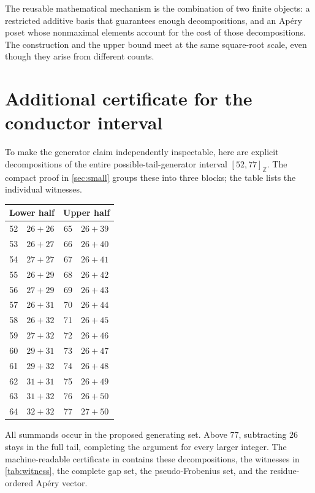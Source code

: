 \documentclass[11pt,letterpaper]{article}
\numberwithin{equation}{section}
\theoremstyle{definition}
\theoremstyle{remark}
\newcommand{\Z}{\mathbb Z}
\newcommand{\ints}[2]{[#1,#2]_{\Z}}
\begin{document}
The reusable mathematical mechanism is the combination of two finite
objects: a restricted additive basis that guarantees enough decompositions,
and an Ap\'ery poset whose nonmaximal elements account for the cost of those
decompositions. The construction and the upper bound meet at the same
square-root scale, even though they arise from different counts.

\appendix
\section{Additional certificate for the conductor interval}\label{sec:certificate}

To make the generator claim independently inspectable, here are explicit
decompositions of the entire possible-tail-generator interval
$\ints{52}{77}$. The compact proof in \cref{sec:small} groups these into
three blocks; the table lists the individual witnesses.

\begin{center}
\begin{tabular}{r@{\;=\;}l@{\qquad}r@{\;=\;}l}
\toprule
\multicolumn{2}{c}{Lower half} & \multicolumn{2}{c}{Upper half}\\
\midrule
52&$26+26$ &65&$26+39$\\
53&$26+27$ &66&$26+40$\\
54&$27+27$ &67&$26+41$\\
55&$26+29$ &68&$26+42$\\
56&$27+29$ &69&$26+43$\\
57&$26+31$ &70&$26+44$\\
58&$26+32$ &71&$26+45$\\
59&$27+32$ &72&$26+46$\\
60&$29+31$ &73&$26+47$\\
61&$29+32$ &74&$26+48$\\
62&$31+31$ &75&$26+49$\\
63&$31+32$ &76&$26+50$\\
64&$32+32$ &77&$27+50$\\
\bottomrule
\end{tabular}
\end{center}

All summands occur in the proposed generating set. Above $77$, subtracting
$26$ stays in the full tail, completing the argument for every larger
integer. The machine-readable certificate in  contains
these decompositions, the witnesses in \cref{tab:witness}, the complete gap
set, the pseudo-Frobenius set, and the residue-ordered Ap\'ery vector.
\end{document}
